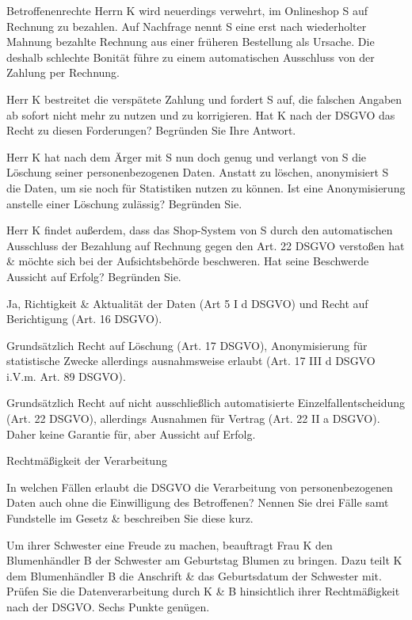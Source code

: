 \documentclass{exercisesheet}
\begin{document}
\begin{eexercises}{Betroffenenrechte}{
    Herrn K wird neuerdings verwehrt, im Onlineshop S auf Rechnung zu bezahlen. Auf Nachfrage nennt S eine erst nach wiederholter Mahnung bezahlte Rechnung aus einer früheren Bestellung als Ursache. Die deshalb schlechte Bonität führe zu einem automatischen Ausschluss von der Zahlung per Rechnung.
  }
  \item Herr K bestreitet die verspätete Zahlung und fordert S auf, die falschen Angaben ab sofort nicht mehr zu nutzen und zu korrigieren. Hat K nach der DSGVO das Recht zu diesen Forderungen? Begründen Sie Ihre Antwort.
  \item Herr K hat nach dem Ärger mit S nun doch genug und verlangt von S die Löschung seiner personenbezogenen Daten. Anstatt zu löschen, anonymisiert S die Daten, um sie noch für Statistiken nutzen zu können. Ist eine Anonymisierung anstelle einer Löschung zulässig? Begründen Sie.
  \item Herr K findet außerdem, dass das Shop-System von S durch den automatischen Ausschluss der Bezahlung auf Rechnung gegen den Art. 22 DSGVO verstoßen hat \& möchte sich bei der Aufsichtsbehörde beschweren. Hat seine Beschwerde Aussicht auf Erfolg? Begründen Sie.
\end{eexercises}

\begin{solutions}
  \item Ja, Richtigkeit \& Aktualität der Daten (Art 5 I d DSGVO) und Recht auf Berichtigung (Art. 16 DSGVO).
  \item Grundsätzlich Recht auf Löschung (Art. 17 DSGVO), Anonymisierung für statistische Zwecke allerdings ausnahmsweise erlaubt (Art. 17 III d DSGVO i.V.m. Art. 89 DSGVO).
  \item Grundsätzlich Recht auf nicht ausschließlich automatisierte Einzelfallentscheidung (Art. 22 DSGVO), allerdings Ausnahmen für Vertrag (Art. 22 II a DSGVO). Daher keine Garantie für, aber Aussicht auf Erfolg.
\end{solutions}

\begin{exercises}{Rechtmäßigkeit der Verarbeitung}
\item In welchen Fällen erlaubt die DSGVO die Verarbeitung von personenbezogenen Daten auch ohne die Einwilligung des Betroffenen? Nennen Sie drei Fälle samt Fundstelle im Gesetz \& beschreiben Sie diese kurz.
\item Um ihrer Schwester eine Freude zu machen, beauftragt Frau K den Blumenhändler B der Schwester am Geburtstag Blumen zu bringen. Dazu teilt K dem Blumenhändler B die Anschrift \& das Geburtsdatum der Schwester mit. Prüfen Sie die Datenverarbeitung durch K \& B hinsichtlich ihrer Rechtmäßigkeit nach der DSGVO. Sechs Punkte genügen.
\end{exercises}
\end{document}
